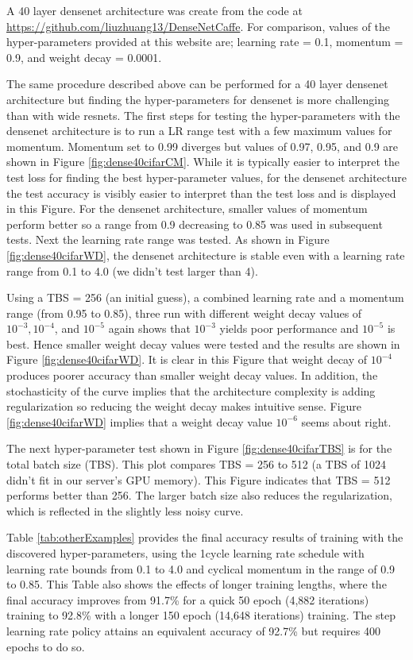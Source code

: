 \documentclass{article} %
\begin{document}
A 40 layer densenet architecture was create from the code at \url{https://github.com/liuzhuang13/DenseNetCaffe}.   For comparison, values of the hyper-parameters provided at this website are; learning rate = 0.1, momentum = 0.9, and weight decay = 0.0001. 

The same procedure described above can be performed for a 40 layer densenet architecture but finding the hyper-parameters for densenet is more challenging  than with wide resnets.  The first steps for testing the hyper-parameters with the densenet architecture is to run a LR range test with a few maximum values for momentum.  Momentum set to 0.99 diverges but values of 0.97, 0.95, and 0.9 are shown in Figure \ref{fig:dense40cifarCM}.     While it is typically easier to interpret the test loss for finding the best hyper-parameter values, for the densenet architecture the test accuracy is  visibly easier to interpret  than the test loss and is displayed in this Figure.   For the densenet architecture, smaller values of momentum perform better so a range from 0.9 decreasing to 0.85 was used in subsequent tests.  Next the learning rate range was tested.  As shown in Figure \ref{fig:dense40cifarWD}, the densenet architecture is stable even with a learning rate range from 0.1 to 4.0 (we didn't test larger than 4).  

Using a TBS = 256 (an initial guess), a combined  learning rate and a momentum range (from 0.95 to 0.85), three run with different weight decay values of $10^{-3}, 10^{-4}$, and $10^{-5}$ again shows that $10^{-3}$ yields poor performance and $10^{-5}$ is best.  Hence smaller weight decay values were tested and the results are shown in Figure \ref{fig:dense40cifarWD}.  It is clear in this Figure that weight decay of $10^{-4}$ produces poorer accuracy than smaller weight decay values.  In addition, the stochasticity of the curve implies that the architecture complexity is adding regularization so reducing the weight decay makes intuitive sense.  Figure \ref{fig:dense40cifarWD} implies that a weight decay value $10^{-6}$ seems about right.

The next hyper-parameter test shown in Figure \ref{fig:dense40cifarTBS} is for the total batch size (TBS).  This plot compares TBS = 256 to 512 (a TBS of 1024 didn't fit in our server's GPU memory).  This Figure indicates that TBS = 512 performs better than 256.  The larger batch size also reduces the regularization, which is reflected in the slightly less noisy curve.  

Table \ref{tab:otherExamples} provides the final accuracy results of training with the discovered hyper-parameters, using the 1cycle learning rate schedule with learning rate bounds from 0.1 to 4.0 and cyclical momentum in the range of 0.9 to 0.85.  This Table also shows the effects of longer training lengths, where the final accuracy improves from 91.7\% for a quick 50 epoch (4,882 iterations) training to 92.8\% with a longer 150 epoch (14,648 iterations) training.  The step learning rate policy attains an equivalent accuracy of 92.7\% but requires 400 epochs to do so.
\end{document}
